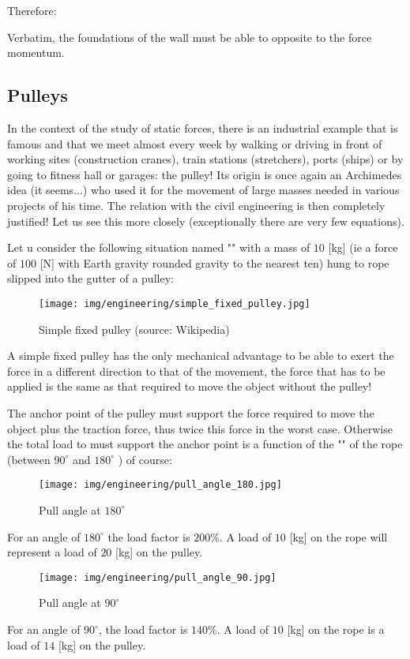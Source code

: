 	Therefore:
	
	Verbatim, the foundations of the wall must be able to opposite to the force momentum.
	
	\pagebreak
	\subsection{Pulleys}
	In the context of the study of static forces, there is an industrial example that is famous and that we meet almost every week by walking or driving in front of working sites (construction cranes), train stations (stretchers), ports (ships) or by going to fitness hall or garages: the pulley! Its origin is once again an Archimedes idea (it seems...) who used it for the movement of large masses needed in various projects of his time. The relation with the civil engineering is then completely justified! Let us see this more closely (exceptionally there are very few equations).
	
	Let u consider the following situation named "" with a mass of $10$ [kg] (ie a force of $100$ [N] with Earth gravity rounded gravity to the nearest ten) hung to rope slipped into the gutter of a pulley:
	\begin{figure}[H]
		\centering
		\texttt{[image: img/engineering/simple\_fixed\_pulley.jpg]}
		\caption[Simple fixed pulley]{Simple fixed pulley (source: Wikipedia)}
	\end{figure}
	A simple fixed pulley has the only mechanical advantage to be able to exert the force in a different direction to that of the movement, the force that has to be applied is the same as that required to move the object without the pulley!
	
	The anchor point of the pulley must support the force required to move the object plus the traction force, thus twice this force in the worst case. Otherwise the total load to must support the anchor point is a function of the "" of the rope (between $90^{\circ}$ and $180^{\circ}$ ) of course:
	\begin{figure}[H]
		\centering
		\texttt{[image: img/engineering/pull\_angle\_180.jpg]}
		\caption{Pull angle at $180^{\circ}$}
	\end{figure}
	For an angle of $180^{\circ}$ the load factor is $200\%$. A load of $10$ [kg] on the rope will represent a load of $20$ [kg] on the pulley.
	\begin{figure}[H]
		\centering
		\texttt{[image: img/engineering/pull\_angle\_90.jpg]}
		\caption{Pull angle at $90^{\circ}$}
	\end{figure}
	For an angle of $90^{\circ}$, the load factor is $140\%$. A load of $10$ [kg] on the rope is a load of $14$ [kg] on the pulley.
	

